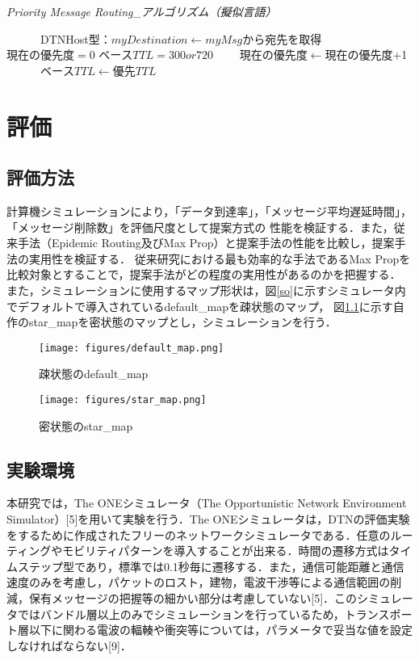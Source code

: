 \documentclass[11pt]{icsthesis}
\begin{document}
\makeatletter
    \renewcommand{\ALG@name}{アルゴリズム}
    \makeatother
    \begin{algorithm}[tb]
    \caption{\it{Priority Message Routing\_アルゴリズム（擬似言語）}}
    \begin{algorithmic}[1]

    　　　\State DTNHost型：$myDestination \gets myMsg$から宛先を取得
          \State $現在の優先度 = 0$
          \State $ベースTTL = 300 or 720$
            　　\State $現在の優先度 \gets 現在の優先度$+1
          　　　\State $ベースTTL \gets 優先TTL$
            \EndIf
    \EndFor
    \end{algorithmic}
    \end{algorithm}
\chapter{評価}
\section{評価方法}
計算機シミュレーションにより，「データ到達率」，「メッセージ平均遅延時間」，「メッセージ削除数」を評価尺度として提案方式の
性能を検証する．また，従来手法（Epidemic Routing及びMax Prop）と提案手法の性能を比較し，提案手法の実用性を検証する．
従来研究における最も効率的な手法であるMax Propを比較対象とすることで，提案手法がどの程度の実用性があるのかを把握する．
また，シミュレーションに使用するマップ形状は，図\ref{so}に示すシミュレータ内でデフォルトで導入されているdefault\_mapを疎状態のマップ，
図\ref{mitsu}に示す自作のstar\_mapを密状態のマップとし，シミュレーションを行う．
\begin{figure}[h]
\centering
\begin{minipage}[b]{0.55\columnwidth}
    \centering
    \texttt{[image: figures/default\_map.png]}
    \caption{疎状態のdefault\_map}
    \label{so}
\end{minipage}
\begin{minipage}[b]{0.39\columnwidth}
    \centering
    \texttt{[image: figures/star\_map.png]}
    \caption{密状態のstar\_map}
    \label{mitsu}
\end{minipage}
\end{figure}
\section{実験環境}
本研究では，The ONEシミュレータ（The Opportunistic Network Environment Simulator）[5]を用いて実験を行う．The ONEシミュレータは，DTNの評価実験をするために作成されたフリーのネットワークシミュレータである．任意のルーティングやモビリティパターンを導入することが出来る．時間の遷移方式はタイムステップ型であり，標準では0.1秒毎に遷移する．また，通信可能距離と通信速度のみを考慮し，パケットのロスト，建物，電波干渉等による通信範囲の削減，保有メッセージの把握等の細かい部分は考慮していない[5]．このシミュレータではバンドル層以上のみでシミュレーションを行っているため，トランスポート層以下に関わる電波の輻輳や衝突等については，パラメータで妥当な値を設定しなければならない[9]．
\end{document}
